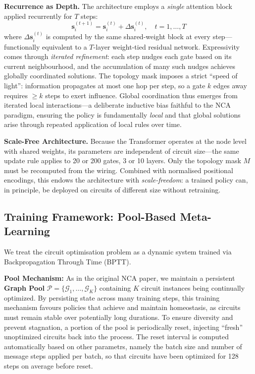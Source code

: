 \textbf{Recurrence as Depth.}
The architecture employs a \textit{single} attention block applied recurrently for $T$ steps:
\begin{equation}
    \mathbf{s}_i^{(t+1)} = \mathbf{s}_i^{(t)} + \Delta\mathbf{s}_i^{(t)}, \quad t = 1, \dots, T
\end{equation}
where $\Delta\mathbf{s}_i^{(t)}$ is computed by the same shared-weight block at every step---functionally equivalent to a $T$-layer weight-tied residual network. Expressivity comes through \textit{iterated refinement}: each step nudges each gate based on its current neighbourhood, and the accumulation of many such nudges achieves globally coordinated solutions. The topology mask imposes a strict ``speed of light'': information propagates at most one hop per step, so a gate $k$ edges away requires $\geq k$ steps to exert influence. Global coordination thus emerges from iterated local interactions---a deliberate inductive bias faithful to the NCA paradigm, ensuring the policy is fundamentally \textit{local} and that global solutions arise through repeated application of local rules over time.

\textbf{Scale-Free Architecture.}
Because the Transformer operates at the node level with shared weights, its parameters are independent of circuit size---the same update rule applies to 20 or 200 gates, 3 or 10 layers. Only the topology mask $M$ must be recomputed from the wiring. Combined with normalised positional encodings, this endows the architecture with \textit{scale-freedom}: a trained policy can, in principle, be deployed on circuits of different size without retraining.



\subsection{Training Framework: Pool-Based Meta-Learning}
We treat the circuit optimisation problem as a dynamic system trained via Backpropagation Through Time (BPTT).

\textbf{Pool Mechanism:}
As in the original NCA paper, we maintain a persistent \textbf{Graph Pool} $\mathcal{P} = \{ \mathcal{G}_1, \dots, \mathcal{G}_K \}$ containing $K$ circuit instances being continually optimized. By persisting state across many training steps, this training mechanism favours policies that achieve and maintain homeostasis, as circuits must remain stable over potentially long durations. To ensure diversity and prevent stagnation, a portion of the pool is periodically reset, injecting ``fresh'' unoptimized circuits back into the process. The reset interval is computed automatically based on other parametrs, namely the batch size and number of message steps applied per batch, so that circuits have been optimized for 128 steps on average before reset. 

